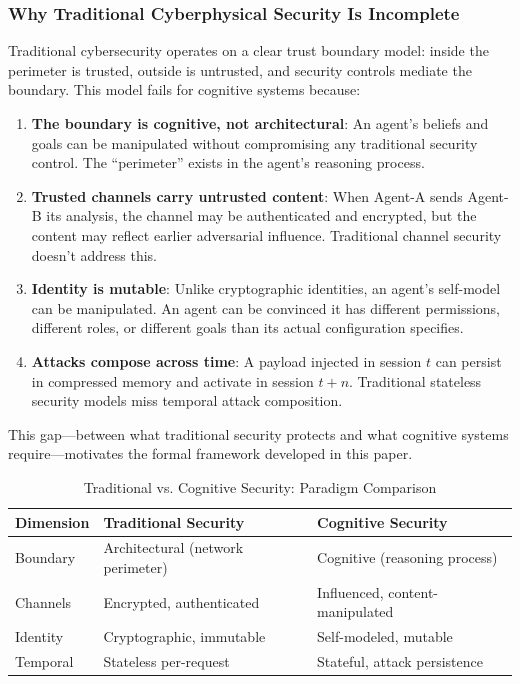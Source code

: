 \documentclass[
]{article}
\begin{document}
\subsubsection{Why Traditional Cyberphysical Security Is
Incomplete}\label{why-traditional-cyberphysical-security-is-incomplete}

Traditional cybersecurity operates on a clear trust boundary model:
inside the perimeter is trusted, outside is untrusted, and security
controls mediate the boundary. This model fails for cognitive systems
because:

\begin{enumerate}
\item \textbf{The boundary is cognitive, not architectural}: An agent's beliefs and goals can be manipulated without compromising any traditional security control. The ``perimeter'' exists in the agent's reasoning process.

\item \textbf{Trusted channels carry untrusted content}: When Agent-A sends Agent-B its analysis, the channel may be authenticated and encrypted, but the content may reflect earlier adversarial influence. Traditional channel security doesn't address this.

\item \textbf{Identity is mutable}: Unlike cryptographic identities, an agent's self-model can be manipulated. An agent can be convinced it has different permissions, different roles, or different goals than its actual configuration specifies.

\item \textbf{Attacks compose across time}: A payload injected in session $t$ can persist in compressed memory and activate in session $t+n$. Traditional stateless security models miss temporal attack composition.
\end{enumerate}

This gap---between what traditional security protects and what cognitive
systems require---motivates the formal framework developed in this
paper.

\begin{table}[htbp]
\centering
\caption{Traditional vs. Cognitive Security: Paradigm Comparison}
\label{tab:security-comparison}
\begin{tabular}{@{}lll@{}}
\toprule
Dimension & Traditional Security & Cognitive Security \\
\midrule
Boundary & Architectural (network perimeter) & Cognitive (reasoning process) \\
Channels & Encrypted, authenticated & Influenced, content-manipulated \\
Identity & Cryptographic, immutable & Self-modeled, mutable \\
Temporal & Stateless per-request & Stateful, attack persistence \\
\bottomrule
\end{tabular}
\end{table}
\end{document}
